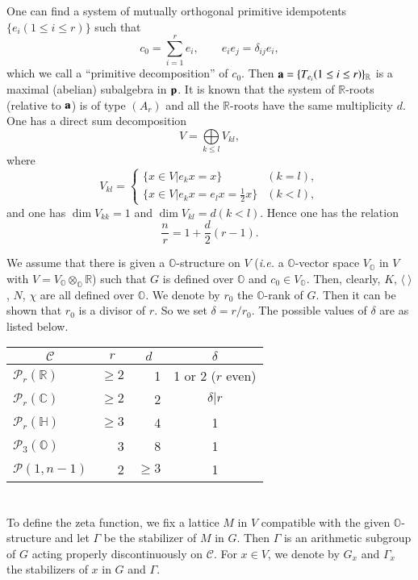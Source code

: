 One can find a system of mutually orthogonal primitive idempotents $\{e_{i}(1\leq i\leq r)\}$ such that
$$
c_{0}=\sum\limits^{r}_{i=1}e_{i},\qquad e_{i}e_{j}=\delta_{ij}e_{i}, 
$$
which we call a ``primitive decomposition'' of $c_{0}$. Then $\mathbf{a}=\{T_{e_{i}}(1\leq i\leq r)\}_{\mathbb{R}}$ is a maximal (abelian) subalgebra in $\mathbf{p}$. It is known that the system of $\mathbb{R}$-roots (relative to $\mathbf{a}$) is of type $(A_{r})$ and all the $\mathbb{R}$-roots have the same multiplicity $d$. One has a direct sum decomposition
$$
V=\bigoplus\limits_{k\leq l}V_{kl},
$$
where
$$
V_{kl}=
\begin{cases}
\{x\in V|e_{k}x=x\} & (k=l),\\
\{x\in V|e_{k}x=e_{l}x=\frac{1}{2}x\} & (k<l),
\end{cases}
$$
and one has $\dim V_{kk}=1$ and $\dim V_{kl}=d(k<l)$. Hence one has the relation
\begin{equation}
\frac{n}{r}=1+\frac{d}{2}(r-1).\label{art11-eq3}
\end{equation}

We assume that there is given a $\mathbb{O}$-structure on $V$ ({\em i.e.} a $\mathbb{O}$-vector space $V_{\mathbb{O}}$ in $V$ with $V=V_{\mathbb{O}}\otimes_{\mathbb{O}}\mathbb{R}$) such that $G$ is defined over $\mathbb{O}$ and $c_{0}\in V_{\mathbb{O}}$. Then, clearly, $K$, $\langle \ \rangle$, $N$, $\chi$ are all defined over $\mathbb{O}$. We denote by $r_{0}$ the $\mathbb{O}$-rank of $G$. Then it can be shown that $r_{0}$ is a divisor of $r$. So we set $\delta=r/r_{0}$. The possible values of $\delta$ are as listed below.
\begin{center}
\tabcolsep=10pt
\begin{tabular}{lrrc}
\multicolumn{1}{c}{$\mathscr{C}$} & \multicolumn{1}{c}{$r$} & \multicolumn{1}{c}{$d$} & \multicolumn{1}{c}{$\delta$}\\ \hline
$\mathscr{P}_{r}(\mathbb{R})$ & $\geq 2$ & 1 & 1 or 2 ($r$ even)\\
$\mathscr{P}_{r}(\mathbb{C})$ & $\geq 2$ & 2 & $\delta | r$\\
$\mathscr{P}_{r}(\mathbb{H})$ & $\geq 3$ & 4 & 1 \\
$\mathscr{P}_{3}(\mathbb{O})$ & 3 & 8 & 1 \\
$\mathscr{P}(1, n-1)$ & 2 & $\geq 3$ & 1
\end{tabular}\pageoriginale
\end{center}

\section{}\label{art11-sec2}
To define the zeta function, we fix a lattice $M$ in $V$ compatible with the given $\mathbb{O}$-structure and let $\Gamma$ be the stabilizer of $M$ in $G$. Then $\Gamma$ is an arithmetic subgroup of $G$ acting properly discontinuously on $\mathscr{C}$. For $x\in V$, we denote by $G_{x}$ and $\Gamma_{x}$ the stabilizers of $x$ in $G$ and $\Gamma$.

